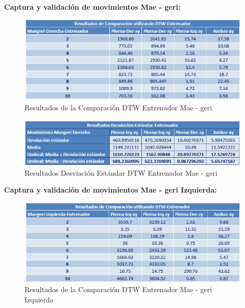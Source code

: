 \textbf{Captura y validación de movimientos Mae - geri:}\\
\begin{figure}[H]%
	\begin{center}
		\includegraphics[scale=1]{./Figuras/Implementacion/Pruebas/Tablas/ResultadosDTW_Entrenador_Maegeri}
	\end{center}
	\caption{Resultados de la Comparación DTW Entrenador Mae - geri}
	\label{fig:ResultadosDTW_Entrenador_Maegeri}
\end{figure}
\begin{figure}[H]%
	\begin{center}
		\includegraphics[scale=1]{./Figuras/Implementacion/Pruebas/Tablas/ResultadorDesvEstandar_Entrenador_Maegeri}
	\end{center}
	\caption{Resultados Desviación Estándar DTW Entrenador Mae - geri}
	\label{fig:ResultadosDTW_Entrenador_Maegeri}
\end{figure}
\textbf{Captura y validación de movimientos Mae - geri Izquierda:}\\
\begin{figure}[H]%
	\begin{center}
		\includegraphics[scale=1]{./Figuras/Implementacion/Pruebas/Tablas/ResultadosDTW_Entrenador_Maegeri-Izquierdo}
	\end{center}
	\caption{Resultados de la Comparación DTW Entrenador Mae - geri Izquierda}
	\label{fig:ResultadosDTW_Entrenador_Maegeri-Izquierdo}
\end{figure}
